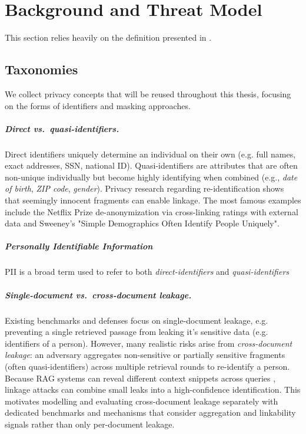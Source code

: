 \chapter{Background and Threat Model}\label{chapter:background}
This section relies heavily on the definition presented in \cite{goodAndBad}.

\section{Taxonomies}
We collect privacy concepts that will be reused throughout this thesis, focusing on the forms of identifiers and masking approaches.

\paragraph{Direct vs.\ quasi-identifiers.}
Direct identifiers uniquely determine an individual on their own (e.g. full names, exact addresses, SSN, national ID). Quasi-identifiers are attributes that are often non-unique individually but become highly identifying when combined (e.g., \textit{date of birth}, \textit{ZIP code}, \textit{gender}). Privacy research regarding re-identification shows that seemingly innocent fragments can enable linkage. The most famous examples include the Netflix Prize de-anonymization via cross-linking ratings with external data and Sweeney's "Simple Demographics Often Identify People Uniquely". \cite{netflixDeAnon, simpleDemographic} 


\paragraph{Personally Identifiable Information}
\ac{PII} is a broad term used to refer to both \textit{direct-identifiers} and \textit{quasi-identifiers}

\paragraph{Single-document vs.\ cross-document leakage.}
Existing benchmarks and defenses focus on single-document leakage, e.g. preventing a single retrieved passage from leaking it's sensitive data (e.g. identifiers of a person). \cite{ragSAGE, goodAndBad}  However, many realistic risks arise from \textit{cross-document leakage}: an  adversary aggregates non-sensitive or partially sensitive fragments (often quasi-identifiers) across multiple retrieval rounds to re-identify a person. \\
Because RAG systems can reveal different context snippets across queries \cite{ragThief}, linkage attacks can combine small leaks into a high-confidence identification.
This motivates modelling and evaluating cross-document leakage separately with dedicated benchmarks and mechanisms that consider aggregation and linkability signals rather than only per-document leakage.

